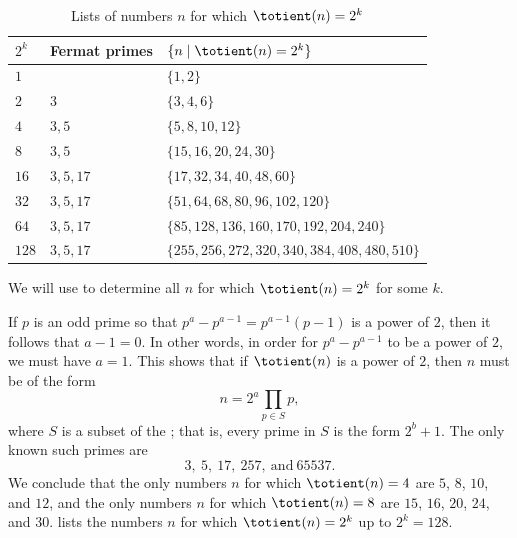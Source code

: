 \begin{example}
  \begin{table}[t]
    \centering
    \begin{tabular}{lll}
      $2^k$ & Fermat primes & $\{n\mid \totient(n)=2^k\}$ \\
      \midrule
      $1$   &             & $\{1,2\}$ \\
      $2$   & $3$         & $\{3,4,6\}$ \\
      $4$   & $3,5$       & $\{5,8,10,12\}$ \\
      $8$   & $3,5$       & $\{15,16,20,24,30\}$ \\
      $16$  & $3,5,17$    & $\{17,32,34,40,48,60\}$ \\
      $32$  & $3,5,17$    & $\{51,64,68,80,96,102,120\}$ \\
      $64$  & $3,5,17$    & $\{85,128,136,160,170,192,204,240\}$ \\
      $128$ & $3,5,17$    & $\{255,256,272,320,340,384,408,480,510\}$
    \end{tabular}
    \caption{\label{table:totient-power-of-two}Lists of numbers $n$ for which $\totient(n)=2^k$}
  \end{table}
  We will use  to determine all $n$ for which $\totient(n)=2^k$ for some $k$.

  If $p$ is an odd prime so that $p^a-p^{a-1}=p^{a-1}(p-1)$ is a power of $2$, then it follows that $a-1=0$. In other words, in order for $p^a-p^{a-1}$ to be a power of $2$, we must have $a=1$. This shows that if $\totient(n)$ is a power of $2$, then $n$ must be of the form
  \begin{equation*}
    n=2^a\prod_{p\in S}p,
  \end{equation*}
  where $S$ is a subset of the ; that is, every prime in $S$ is the form $2^b+1$. The only known such primes are
  \begin{equation*}
    3,~5,~17,~257,~\text{and}~65537.
  \end{equation*}
  We conclude that the only numbers $n$ for which $\totient(n)=4$ are $5$, $8$, $10$, and $12$, and the only numbers $n$ for which $\totient(n)=8$ are $15$, $16$, $20$, $24$, and $30$.  lists the numbers $n$ for which $\totient(n)=2^k$ up to $2^k=128$.
\end{example}


